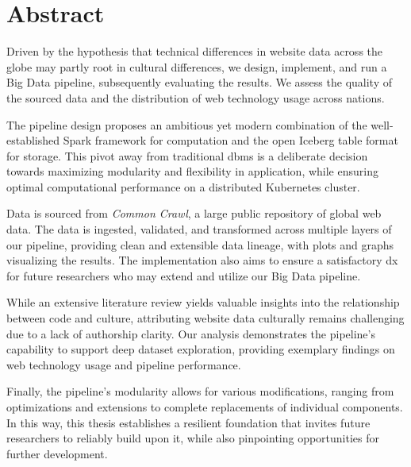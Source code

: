 \setcounter{secnumdepth}{0}
\section{Abstract}

Driven by the hypothesis that technical differences in website data across the globe may partly root in cultural differences, we design, implement, and run a Big Data pipeline, subsequently evaluating the results.
We assess the quality of the sourced data and the distribution of web technology usage across nations.

The pipeline design proposes an ambitious yet modern combination of the well-established Spark framework for computation and the open Iceberg table format for storage.
This pivot away from traditional \ac{dbms} is a deliberate decision towards maximizing modularity and flexibility in application, while ensuring optimal computational performance on a distributed Kubernetes cluster.

Data is sourced from \textit{Common Crawl}, a large public repository of global web data.
The data is ingested, validated, and transformed across multiple layers of our pipeline, providing clean and extensible data lineage, with plots and graphs visualizing the results.
The implementation also aims to ensure a satisfactory \ac{dx} for future researchers who may extend and utilize our Big Data pipeline.

While an extensive literature review yields valuable insights into the relationship between code and culture, attributing website data culturally remains challenging due to a lack of authorship clarity.
Our analysis demonstrates the pipeline's capability to support deep dataset exploration, providing exemplary findings on web technology usage and pipeline performance.

Finally, the pipeline's modularity allows for various modifications, ranging from optimizations and extensions to complete replacements of individual components.
In this way, this thesis establishes a resilient foundation that invites future researchers to reliably build upon it, while also pinpointing opportunities for further development.

\setcounter{secnumdepth}{4}
